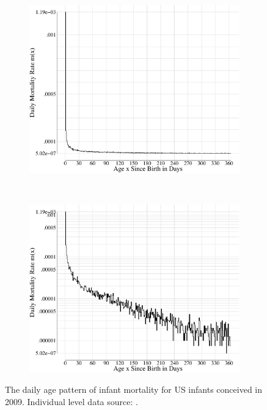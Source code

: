 \documentclass[
  12pt
]{scrartcl}
\begin{document}
\begin{figure}[!htb]
  \begin{subfigure}[t]{0.5\textwidth}
    \centering
    \includegraphics[width = \textwidth]{./fig/us_imort_2009_mx.pdf}
    \label{fig:us_imort_2009_mx_a}
    \end{subfigure}%
  ~
    \begin{subfigure}[t]{0.5\textwidth}
    \includegraphics[width = \textwidth]{./fig/us_imort_2009_log_mx.pdf}
    \label{fig:us_imort_2009_mx_b}
    \end{subfigure}%
    \caption{The daily age pattern of infant mortality for US infants conceived in 2009. Individual level data source: \cite{DVS2015}.}
    \label{fig:us_imort_2009_mx}
\end{figure}
\end{document}
